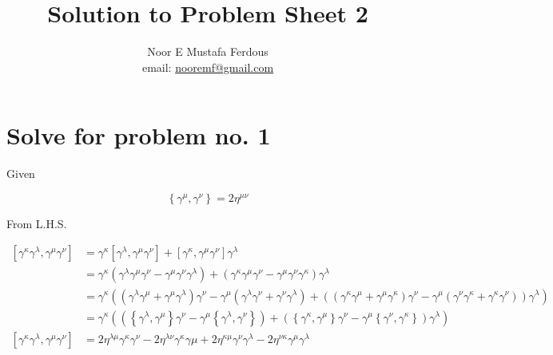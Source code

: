 \documentclass[12pt, letterpaper]{article}
\title{Solution to Problem Sheet 2}
\author{Noor E Mustafa Ferdous\\ email: \href{mailto:nooremf@gmail.com}{nooremf@gmail.com} }
\date{}
\newcommand*{\1}{\hspace{1pt}}
\begin{document}
\maketitle

\section*{Solve for problem no. 1}
Given

\begin{equation}
    \left\{ \gamma ^{\mu}, \gamma ^{\nu} \right\} = 2 \eta ^{\mu \nu}    
\end{equation}

From L.H.S. 

\begin{align*}
    \left[ \gamma ^{\kappa} \gamma ^{\lambda}, \gamma ^{\mu} \gamma ^{\nu} \right] &= \gamma ^{\kappa} \left[ \gamma ^{\lambda}, \gamma ^{\mu} \gamma ^{\nu}\right] + \left[\gamma ^{\kappa}, \gamma ^{\mu} \gamma ^{\nu}\right] \gamma ^{\lambda} \\ 
    &= \gamma ^{\kappa} \left( \gamma ^{\lambda}\gamma ^{\mu} \gamma ^{\nu} - \gamma ^{\mu} \gamma ^{\nu}\gamma ^{\lambda}\right) + \left(\gamma ^{\kappa}\gamma ^{\mu} \gamma ^{\nu} - \gamma ^{\mu} \gamma ^{\nu} \gamma ^{\kappa}\right)\gamma ^{\lambda} \\ 
    &= \gamma ^{\kappa} \left( \left(\gamma ^{\lambda}\gamma ^{\mu} + \gamma ^{\mu}\gamma ^{\lambda}\right) \gamma ^{\nu} - \gamma ^{\mu} \left( \gamma ^{\lambda} \gamma ^{\nu} + \gamma ^{\nu} \gamma ^{\lambda} \right) + \left( \left(\gamma ^{\kappa}\gamma ^{\mu} +\gamma ^{\mu}\gamma ^{\kappa}\right) \gamma ^{\nu} - \gamma ^{\mu} \left(\gamma ^{\nu} \gamma ^{\kappa} + \gamma ^{\kappa} \gamma ^{\nu} \right) \right)\gamma ^{\lambda}\right) \\
    &= \gamma ^{\kappa} \left(\left( \left\{ \gamma ^{\lambda}, \gamma ^{\mu} \right\} \gamma ^{\nu} - \gamma ^{\mu} \left\{ \gamma ^{\lambda}, \gamma ^{\nu} \right\} \right) + \left( \left\{ \gamma ^{\kappa}, \gamma ^{\mu} \right\} \gamma ^{\nu} - \gamma ^{\mu} \left\{\gamma ^{\nu}, \gamma ^{\kappa} \right\} \right)\gamma ^{\lambda}\right) \\
   \left[ \gamma ^{\kappa} \gamma ^{\lambda}, \gamma ^{\mu} \gamma ^{\nu} \right] &= 2\eta ^{\lambda \mu} \gamma ^{\kappa} \gamma ^{\nu} - 2\eta ^{\lambda \nu} \gamma ^{\kappa} \gamma \mu + 2\eta ^{\kappa \mu} \gamma ^{\nu} \gamma ^{\lambda} - 2\eta ^{\nu \kappa} \gamma ^{\mu} \gamma ^{\lambda} \tag{Showed}
\end{align*}
\end{document}
